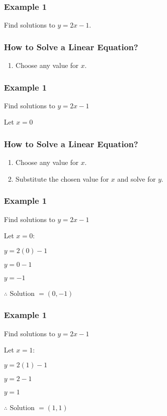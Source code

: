 \documentclass[14pt]{beamer}
\begin{document}
    \begin{frame}
    	\frametitle{Example 1}
    	Find solutions to $ y = 2x - 1 $.
    \end{frame}

    \begin{frame}
    	\frametitle{How to Solve a Linear Equation?}
    	\begin{enumerate}
    		\item Choose any value for $ x $.
    	\end{enumerate}
    \end{frame}

    \begin{frame}
    	\frametitle{Example 1}
    	Find solutions to $ y = 2x - 1 $ 
    	
    	\pause \vone Let $ x = 0 $
    \end{frame}

    \begin{frame}
    	\frametitle{How to Solve a Linear Equation?}
    	\begin{enumerate}
    		\item Choose any value for $ x $.
    		\item Substitute the chosen value for $ x $ and solve for $ y $.
    	\end{enumerate}
    \end{frame}

    \begin{frame}
    	\frametitle{Example 1}
    	Find solutions to $ y = 2x - 1 $ 
    	
    	\vone Let $ x = 0 $:
    	
    	\pause \vone $ y = 2(0) - 1 $ 
    	
    	\pause \vone $ y = 0 - 1 $ 
    	
    	\pause \vone $ y = - 1 $ 
    	
    	\pause \vone $ \therefore $ Solution $ = (0, -1) $
    \end{frame}

    \begin{frame}
    	\frametitle{Example 1}
    	Find solutions to $ y = 2x - 1 $ 
    	
    	\vone Let $ x = 1 $:
    	
    	\pause \vone $ y = 2(1) - 1 $ 
    	
    	\pause \vone $ y = 2 - 1 $ 
    	
    	\pause \vone $ y = 1 $ 
    	
    	\pause \vone $ \therefore $ Solution $ = (1, 1) $
    \end{frame}
\end{document}
